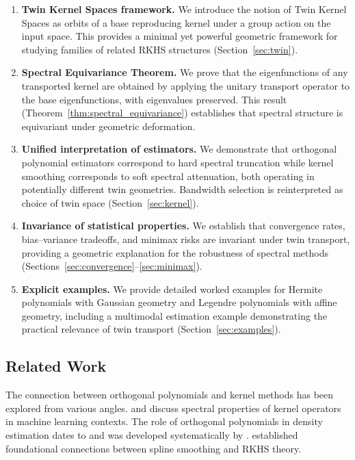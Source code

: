 \documentclass[11pt,a4paper]{article}
\begin{document}
\begin{enumerate}[label=(\roman*)]
\item \textbf{Twin Kernel Spaces framework.} We introduce the notion of Twin Kernel Spaces as orbits of a base reproducing kernel under a group action on the input space. This provides a minimal yet powerful geometric framework for studying families of related RKHS structures (Section~\ref{sec:twin}).

\item \textbf{Spectral Equivariance Theorem.} We prove that the eigenfunctions of any transported kernel are obtained by applying the unitary transport operator to the base eigenfunctions, with eigenvalues preserved. This result (Theorem~\ref{thm:spectral_equivariance}) establishes that spectral structure is equivariant under geometric deformation.

\item \textbf{Unified interpretation of estimators.} We demonstrate that orthogonal polynomial estimators correspond to hard spectral truncation while kernel smoothing corresponds to soft spectral attenuation, both operating in potentially different twin geometries. Bandwidth selection is reinterpreted as choice of twin space (Section~\ref{sec:kernel}).

\item \textbf{Invariance of statistical properties.} We establish that convergence rates, bias--variance tradeoffs, and minimax risks are invariant under twin transport, providing a geometric explanation for the robustness of spectral methods (Sections~\ref{sec:convergence}--\ref{sec:minimax}).

\item \textbf{Explicit examples.} We provide detailed worked examples for Hermite polynomials with Gaussian geometry and Legendre polynomials with affine geometry, including a multimodal estimation example demonstrating the practical relevance of twin transport (Section~\ref{sec:examples}).
\end{enumerate}

\subsection{Related Work}

The connection between orthogonal polynomials and kernel methods has been explored from various angles. \citet{Smola2000} and \citet{Scholkopf2002} discuss spectral properties of kernel operators in machine learning contexts. The role of orthogonal polynomials in density estimation dates to \citet{Cencov1962} and was developed systematically by \citet{Efromovich1999}. \citet{Wahba1990} established foundational connections between spline smoothing and RKHS theory.
\end{document}
